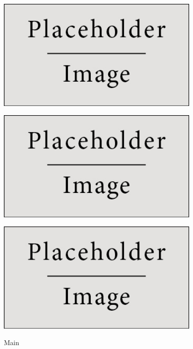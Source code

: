 \documentclass[11pt,twoside,a4paper]{report}
\begin{document}
\begin{figure}[H]
	\centering
	\begin{minipage}{.5\textwidth}
		\begin{center}
			\includegraphics[width=0.9\textwidth]{placeholder} %
			\label{fig:admin5}
		\end{center}
	\end{minipage}%
	\begin{minipage}{.5\textwidth}
		\begin{center}
			\includegraphics[width=0.9\textwidth]{placeholder} %
			\label{fig:admin6}
		\end{center}
	\end{minipage}
	\begin{minipage}{.5\textwidth}
		\begin{center}
			\includegraphics[width=0.9\textwidth]{placeholder} %
			\label{fig:admin7}
		\end{center}
	\end{minipage}
	\caption{Main}
	\label{fig:admin4}
\end{figure}
\end{document}
